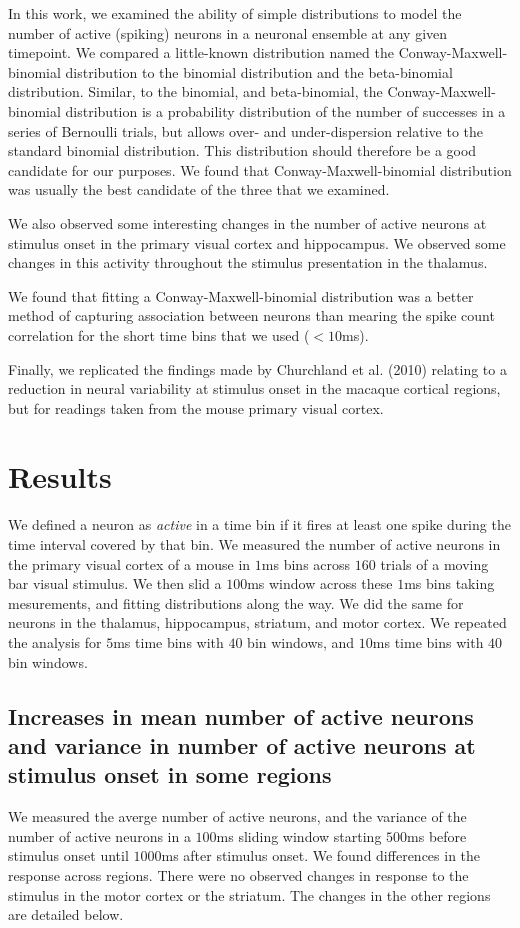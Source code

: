 \documentclass[a4paper,12pt]{article}
\theoremstyle{definition}
\begin{document}
In this work, we examined the ability of simple distributions to model the number of active (spiking) neurons in a neuronal ensemble at any given timepoint. We compared a little-known distribution named the Conway-Maxwell-binomial distribution to the binomial distribution and the beta-binomial distribution. Similar, to the binomial, and beta-binomial, the Conway-Maxwell-binomial distribution is a probability distribution of the number of successes in a series of Bernoulli trials, but allows over- and under-dispersion relative to the standard binomial distribution. This distribution should therefore be a good candidate for our purposes. We found that Conway-Maxwell-binomial distribution was usually the best candidate of the three that we examined.

We also observed some interesting changes in the number of active neurons at stimulus onset in the primary visual cortex and hippocampus. We observed some changes in this activity throughout the stimulus presentation in the thalamus.

We found that fitting a Conway-Maxwell-binomial distribution was a better method of capturing association between neurons than mearing the spike count correlation for the short time bins that we used ($<10$ms).

Finally, we replicated the findings made by Churchland et al. (2010) relating to a reduction in neural variability at stimulus onset in the macaque cortical regions, but for readings taken from the mouse primary visual cortex.

\section{Results}
We defined a neuron as \textit{active} in a time bin if it fires at least one spike during the time interval covered by that bin. We measured the number of active neurons in the primary visual cortex of a mouse in $1$ms bins across $160$ trials of a moving bar visual stimulus. We then slid a $100$ms window across these $1$ms bins taking mesurements, and fitting distributions along the way. We did the same for neurons in the thalamus, hippocampus, striatum, and motor cortex. We repeated the analysis for $5$ms time bins with $40$ bin windows, and $10$ms time bins with $40$ bin windows.

  \subsection{Increases in mean number of active neurons and variance in number of active neurons at stimulus onset in some regions}
  We measured the averge number of active neurons, and the variance of the number of active neurons in a $100$ms sliding window starting $500$ms before stimulus onset until $1000$ms after stimulus onset. We found differences in the response across regions. There were no observed changes in response to the stimulus in the motor cortex or the striatum. The changes in the other regions are detailed below.
\end{document}
